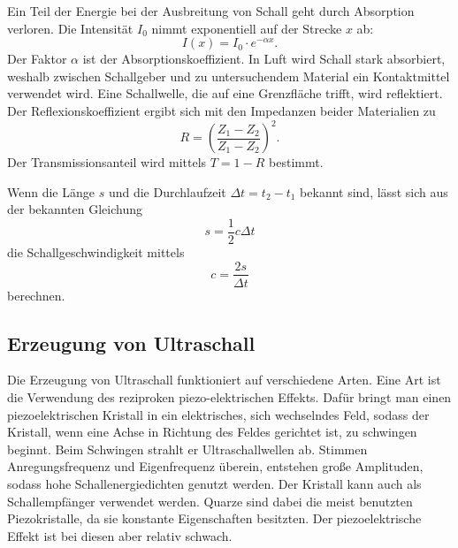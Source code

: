 \noindent Ein Teil der Energie bei der Ausbreitung von Schall geht 
durch Absorption verloren. Die Intensität $I_0$ nimmt 
exponentiell auf der Strecke $x$ ab:
\begin{equation}
    I(x)= I_0 \cdot e^{-\alpha x}.
    \label{eqn:I}
\end{equation}
Der Faktor $\alpha$ 
ist der Absorptionskoeffizient.
In Luft wird Schall stark absorbiert, weshalb zwischen 
Schallgeber und zu untersuchendem Material ein Kontaktmittel 
verwendet wird.
\newline
Eine Schallwelle, die auf eine Grenzfläche trifft, wird 
reflektiert. Der Reflexionskoeffizient ergibt sich mit den 
Impedanzen beider Materialien zu 
\begin{equation*}
    R = \left(\frac{Z_1-Z_2}{Z_1-Z_2}\right)^2. %
\end{equation*}
Der Transmissionsanteil wird mittels $T= 1-R$ bestimmt.

\noindent Wenn die Länge $s$ und die Durchlaufzeit $\Delta t = t_2 - t_1$
bekannt sind, lässt sich aus der bekannten Gleichung
\begin{equation}
    s=\frac{1}{2}c \Delta t
    \label{eqn:s}
\end{equation}
die Schallgeschwindigkeit mittels
\begin{equation}
    c = \frac{2 s}{\Delta t}
    \label{eqn:c}
\end{equation}
berechnen.

\subsection{Erzeugung von Ultraschall}
\noindent Die Erzeugung von Ultraschall funktioniert auf verschiedene 
Arten. Eine Art ist die Verwendung des reziproken 
piezo-elektrischen Effekts. Dafür bringt man einen 
piezoelektrischen Kristall in ein elektrisches, sich
wechselndes Feld, sodass der Kristall, wenn eine Achse in 
Richtung des Feldes gerichtet ist, zu 
schwingen beginnt. Beim Schwingen strahlt er Ultraschallwellen ab. 
Stimmen Anregungsfrequenz und Eigenfrequenz überein, 
entstehen große Amplituden, sodass hohe Schallenergiedichten 
genutzt werden. Der Kristall kann auch als Schallempfänger 
verwendet werden. Quarze sind dabei die meist benutzten 
Piezokristalle, da sie konstante Eigenschaften besitzten. 
Der piezoelektrische Effekt ist bei diesen aber relativ schwach. 


